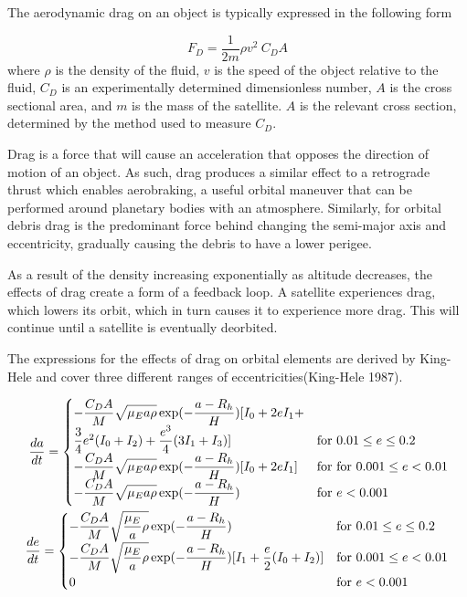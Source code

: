 \documentclass[a4paper, 12pt]{article}
\begin{document}
The aerodynamic drag on an object is typically expressed in the following form

\begin{equation}
	F_D = \frac{1}{2m} \rho v^2 \: C_D A
\end{equation}
where $\rho$ is the density of the fluid, $v$ is the speed of the object relative to the fluid, $C_D$ is an experimentally determined dimensionless number, $A$ is the cross sectional area, and $m$ is the mass of the satellite. $A$ is the relevant cross section, determined by the method used to measure $C_D$. 

Drag is a force that will cause an acceleration that opposes the direction of motion of an object. As such, drag produces a similar effect to a retrograde thrust which enables aerobraking, a useful orbital maneuver that can be performed around planetary bodies with an atmosphere. Similarly, for orbital debris drag is the predominant force behind changing the semi-major axis and eccentricity, gradually causing the debris to have a lower perigee. 

As a result of the density increasing exponentially as altitude decreases, the effects of drag create a form of a feedback loop. A satellite experiences drag, which lowers its orbit, which in turn causes it to experience more drag. This will continue until a satellite is eventually deorbited. 

The expressions for the effects of drag on orbital elements are derived by King-Hele and cover three different ranges of eccentricities(King-Hele 1987).

\begin{align}
		\dfrac{da}{dt} = \begin{cases}
			-\dfrac{C_D A}{M} \sqrt{\mathstrut\mu_E a \rho} \exp(-\dfrac{a - R_h}{H})[I_0 
			+ 2eI_1 + \\ \dfrac{3}{4}e^2(I_0 + I_2) + \dfrac{e^3}{4}(3I_1 +I_3)] & \text{for } 0.01 \leq e \leq 0.2 \\
			-\dfrac{C_D A}{M} \sqrt{\mathstrut\mu_E a \rho}\exp(-\dfrac{a - R_h}{H})[I_0 + 2eI_1 ] & \text{for } \text{for } 0.001 \leq e < 0.01\\
			-\dfrac{C_D A}{M} \sqrt{\mathstrut\mu_E a \rho}\exp(-\dfrac{a - R_h}{H}) & \text{for } e < 0.001
		\end{cases}\\
		\newline
		\dfrac{de}{dt} = \begin{cases}
			-\dfrac{C_D A}{M} \sqrt{\mathstrut\dfrac{\mu_E}{a} \rho}\exp(-\dfrac{a - R_h}{H}) & \text{for } 0.01 \leq e \leq 0.2  \\
			-\dfrac{C_D A}{M} \sqrt{\mathstrut\dfrac{\mu_E}{a} \rho}\exp(-\dfrac{a - R_h}{H})[I_1 + \dfrac{e}{2}(I_0 + I_2)] & \text{for } 0.001 \leq e < 0.01\\
			0 & \text{for } e < 0.001
		\end{cases}
	\end{align}
\end{document}
